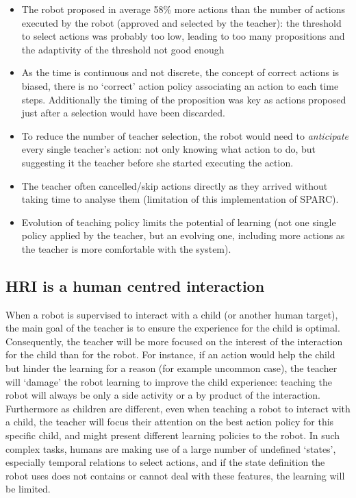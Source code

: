 
\begin{itemize}
	\item The robot proposed in average 58\% more actions than the number of actions executed by the robot (approved and selected by the teacher): the threshold to select actions was probably too low, leading to too many propositions and the adaptivity of the threshold not good enough
	\item As the time is continuous and not discrete, the concept of correct actions is biased, there is no `correct' action policy associating an action to each time steps. Additionally the timing of the proposition was key as actions proposed just after a selection would have been discarded.
	\item To reduce the number of teacher selection, the robot would need to \emph{anticipate} every single teacher's action: not only knowing what action to do, but suggesting it the teacher before she started executing the action.
	\item The teacher often cancelled/skip actions directly as they arrived without taking time to analyse them (limitation of this implementation of SPARC).
	\item Evolution of teaching policy limits the potential of learning (not one single policy applied by the teacher, but an evolving one, including more actions as the teacher is more comfortable with the system).
\end{itemize}

\subsection{HRI is a human centred interaction}

When a robot is supervised to interact with a child (or another human target), the main goal of the teacher is to ensure the experience for the child is optimal. Consequently, the teacher will be more focused on the interest of the interaction for the child than for the robot. For instance, if an action would help the child but hinder the learning for a reason (for example uncommon case), the teacher will `damage' the robot learning to improve the child experience: teaching the robot will always be only a side activity or a by product of the interaction. Furthermore as children are different, even when teaching a robot to interact with a child, the teacher will focus their attention on the best action policy for this specific child, and might present different learning policies to the robot. In such complex tasks, humans are making use of a large number of undefined  `states', especially temporal relations to select actions, and if the state definition the robot uses does not contains or cannot deal with these features, the learning will be limited.

